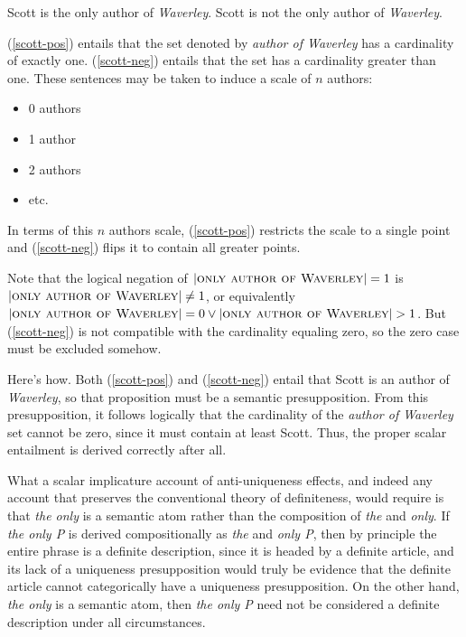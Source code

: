 \documentclass{article}
\begin{document}
\begin{exe}
	\ex \label{scott-pos} Scott is the only author of \textit{Waverley}.
	\ex \label{scott-neg} Scott is not the only author of \textit{Waverley}.
\end{exe}

(\ref{scott-pos}) entails that the set denoted by \textit{author of Waverley} has a cardinality of exactly one. (\ref{scott-neg}) entails that the set has a cardinality greater than one. These sentences may be taken to induce a scale of $n$ authors:

\begin{itemize}
	\item 0 authors
	\item 1 author
	\item 2 authors
	\item etc.
\end{itemize}

In terms of this $n$ authors scale, (\ref{scott-pos}) restricts the scale to a single point and (\ref{scott-neg}) flips it to contain all greater points.

Note that the logical negation of $|\textsc{only author of Waverley}| = 1$ is
$|\textsc{only author of Waverley}| \ne 1$, or equivalently $|\textsc{only author of Waverley}| = 0 \lor |\textsc{only author of Waverley}| > 1$. But (\ref{scott-neg}) is not compatible with the cardinality equaling zero, so the zero case must be excluded somehow.

Here's how. Both (\ref{scott-pos}) and (\ref{scott-neg}) entail that Scott is an author of \textit{Waverley}, so that proposition must be a semantic presupposition. From this presupposition, it follows logically that the cardinality of the \textit{author of Waverley} set cannot be zero, since it must contain at least Scott. Thus, the proper scalar entailment is derived correctly after all.

What a scalar implicature account of anti-uniqueness effects, and indeed any account that preserves the conventional theory of definiteness, would require is that \textit{the only} is a semantic atom rather than the composition of \textit{the} and \textit{only}. If \textit{the only P} is derived compositionally as \textit{the} and \textit{only P}, then by principle the entire phrase is a definite description, since it is headed by a definite article, and its lack of a uniqueness presupposition would truly be evidence that the definite article cannot categorically have a uniqueness presupposition. On the other hand, \textit{the only} is a semantic atom, then \textit{the only P} need not be considered a definite description under all circumstances.
\end{document}
